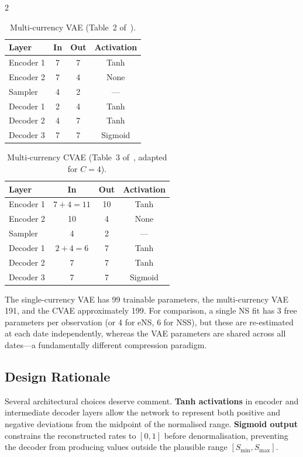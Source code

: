\documentclass[10pt,a4paper]{article}
\theoremstyle{plain}
\theoremstyle{definition}
\begin{document}
\begin{multicols}{2}
\begin{table}[H]
\centering
\caption{Multi-currency VAE (Table~2 of~\cite{sokol2022}).}\label{tab:mc_vae}
\begin{tabular}{lccc}
\toprule
Layer & In & Out & Activation \\
\midrule
Encoder 1 & 7 & 7 & Tanh \\
Encoder 2 & 7 & 4 & None \\
Sampler & 4 & 2 & --- \\
Decoder 1 & 2 & 4 & Tanh \\
Decoder 2 & 4 & 7 & Tanh \\
Decoder 3 & 7 & 7 & Sigmoid \\
\bottomrule
\end{tabular}
\end{table}

\begin{table}[H]
\centering
\caption{Multi-currency CVAE (Table~3 of~\cite{sokol2022}, adapted for $C=4$).}\label{tab:cvae}
\begin{tabular}{lccc}
\toprule
Layer & In & Out & Activation \\
\midrule
Encoder 1 & $7{+}4=11$ & 10 & Tanh \\
Encoder 2 & 10 & 4 & None \\
Sampler & 4 & 2 & --- \\
Decoder 1 & $2{+}4=6$ & 7 & Tanh \\
Decoder 2 & 7 & 7 & Tanh \\
Decoder 3 & 7 & 7 & Sigmoid \\
\bottomrule
\end{tabular}
\end{table}

The single-currency VAE has 99 trainable parameters, the multi-currency VAE 191, and the CVAE approximately 199. For comparison, a single NS fit has 3 free parameters per observation (or 4 for eNS, 6 for NSS), but these are re-estimated at each date independently, whereas the VAE parameters are shared across all dates---a fundamentally different compression paradigm.

\subsection{Design Rationale}

Several architectural choices deserve comment. \textbf{Tanh activations} in encoder and intermediate decoder layers allow the network to represent both positive and negative deviations from the midpoint of the normalised range. \textbf{Sigmoid output} constrains the reconstructed rates to $[0,1]$ before denormalisation, preventing the decoder from producing values outside the plausible range $[S_{\min}, S_{\max}]$.


\end{multicols}
\end{document}
